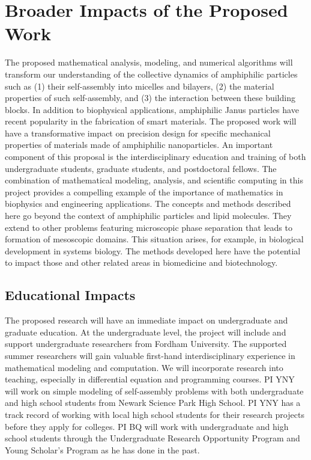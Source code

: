 \section{Broader Impacts of the Proposed Work}
\label{sec:BroaderImpacts}

The proposed mathematical analysis, modeling, and numerical algorithms
will transform our understanding of the collective dynamics of
amphiphilic particles such as (1) their self-assembly into micelles and
bilayers, (2) the material properties of such self-assembly, and (3) the
interaction between these building blocks. In addition to biophysical
applications, amphiphilic Janus particles have recent popularity in the
fabrication of smart materials. The proposed work will have a
transformative impact on precision design for specific mechanical
properties of materials made of amphiphilic nanoparticles. An important
component of this proposal is the interdisciplinary education and
training of both undergraduate students, graduate students, and
postdoctoral fellows. The combination of mathematical modeling,
analysis, and scientific computing in this project provides a compelling
example of the importance of mathematics in biophysics and engineering
applications. The concepts and methods described here go beyond the
context of amphiphilic particles and lipid molecules. They extend to
other problems featuring microscopic phase separation that leads to
formation of mesoscopic domains. This situation arises, for example, in
biological development in systems biology. The methods developed here
have the potential to impact those and other related areas in
biomedicine and biotechnology.

\subsection{Educational Impacts}
\label{subsec:Educational_plans}
The proposed research will have an immediate impact on undergraduate and
graduate education. At the undergraduate level, the project will include
and support undergraduate researchers from Fordham University. The
supported summer researchers will gain valuable first-hand
interdisciplinary experience in mathematical modeling and computation.
We will incorporate research into teaching, especially in differential
equation and programming courses. PI YNY will work on simple modeling of
self-assembly problems with both undergraduate and high school students
from Newark Science Park High School. PI YNY has a track record of
working with local high school students for their research projects
before they apply for colleges. PI BQ will work with undergraduate and
high school students through the Undergraduate Research Opportunity
Program and Young Scholar's Program as he has done in the past.

